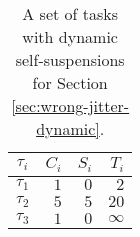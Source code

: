 \begin{table}[t]
\begin{center}
\begin{tabular}{|c|r|r|r|}
\hline
$\tau_i$ &      $C_i$   &   $S_i$  &     $T_i$     \\ \hline
$\tau_1$ &       $1$   &     $0$  &       $2$     \\ \hline
$\tau_2$  &      $5$   &     $5$  &      $20$     \\ \hline
$\tau_3$  &      $1$   &     $0$  &  $\infty$     \\ \hline
\end{tabular}
\end{center}
\caption{A set of tasks with dynamic self-suspensions for Section \ref{sec:wrong-jitter-dynamic}.}
\label{tab:counterexample-dynamic-suspension}
\end{table}


